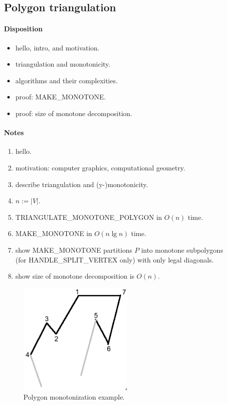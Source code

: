 \newpage

\subsection{Polygon triangulation}

\paragraph{Disposition}

\begin{itemize}
  \item hello, intro, and motivation.
  \item triangulation and monotonicity.
  \item algorithms and their complexities.
  \item proof: MAKE\_MONOTONE.
  \item proof: size of monotone decomposition.
\end{itemize}

\paragraph{Notes}

\begin{enumerate}
  \item hello.
  \item motivation: computer graphics, computational geometry.

  \item describe triangulation and (y-)monotonicity.

  \item $n := |V|$.

  \item TRIANGULATE\_MONOTONE\_POLYGON in $O(n)$ time.
  \item MAKE\_MONOTONE in $O(n \lg n)$ time.

  \item show MAKE\_MONOTONE partitions $P$ into monotone subpolygons \\(for
    HANDLE\_SPLIT\_VERTEX only) with only legal diagonals.
  \item show size of monotone decomposition is $O(n)$.
\end{enumerate}

\begin{figure}[H]
  \centering
  \includegraphics[width=0.5\textwidth]{figures/monotonization_example.png}
  \caption{Polygon monotonization example.}
  \label{fig:monotonization_example}
\end{figure}

